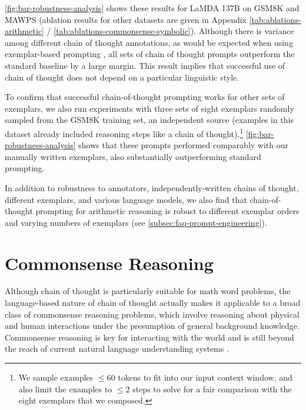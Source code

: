 \ref{fig:bar-robustness-analysis} shows these results for LaMDA 137B on GSM8K and MAWPS (ablation results for other datasets are given in Appendix \ref{tab:ablations-arithmetic} / \ref{tab:ablations-commonsense-symbolic}).
Although there is variance among different chain of thought annotations, as would be expected when using exemplar-based prompting \citep{le-scao-rush-2021-many,reynolds2021prompt,zhao2021calibrate}, all sets of chain of thought prompts outperform the standard baseline by a large margin. This result implies that successful use of chain of thought does not depend on a particular linguistic style.

To confirm that successful chain-of-thought prompting works for other sets of exemplars, we also run experiments with three sets of eight exemplars randomly sampled from the GSM8K training set, an independent source (examples in this dataset already included reasoning steps like a chain of thought).\footnote{We sample examples $\leq 60$ tokens to fit into our input context window, and also limit the examples to $\leq 2$ steps to solve for a fair comparison with the eight exemplars that we composed.}
\ref{fig:bar-robustness-analysis} shows that these prompts performed comparably with our manually written exemplars, also substantially outperforming standard prompting.

In addition to robustness to annotators, independently-written chains of thought, different exemplars, and various language models, we also find that chain-of-thought prompting for arithmetic reasoning is robust to different exemplar orders and varying numbers of exemplars (see \ref{subsec:faq-prompt-engineering}).

\section{Commonsense Reasoning}\label{sec:commonsense-reasoning}

Although chain of thought is particularly suitable for math word problems, the language-based nature of chain of thought actually makes it applicable to a broad class of commonsense reasoning problems, which involve reasoning about physical and human interactions under the presumption of general background knowledge. Commonsense reasoning is key for interacting with the world and is still beyond the reach of current natural language understanding systems \citep{talmor2022commonsenseqa}.


